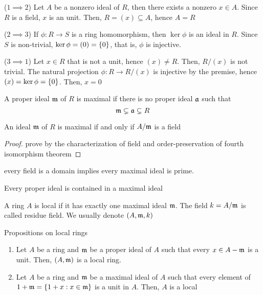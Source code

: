 \begin{longproof}
	($1 \implies 2$) Let $A$ be a nonzero ideal of $R$, then there exists a nonzero $x \in A$. Since $R$ is a field, $x$ is an unit. Then, $R = (x) \subseteq A$, hence $A = R$
	
	($2 \implies 3$) If $\phi: R \to S$ is a ring homomorphism, then $\ker \phi$ is an ideal in $R$. Since $S$ is non-trivial, $\ker \phi = (0) = \{0\}$, that is, $\phi$ is injective.
	
	($3 \implies 1$) Let $x \in R$ that is not a unit, hence $(x) \neq R$. Then, $R / (x)$ is not trivial. The natural projection $\phi: R \to R / (x)$ is injective by the premise, hence $(x) = \ker \phi = \{0\}$. Then, $x = 0$
\end{longproof}

\begin{definition}
	A proper ideal $\mathfrak{m}$ of $R$ is maximal if there is no proper ideal $\mathfrak{a}$ such that
	$$
		\mathfrak{m} \subsetneq \mathfrak{a} \subsetneq R
	$$
\end{definition}

\begin{proposition}
	An ideal $\mathfrak{m}$ of $R$ is maximal if and only if $A / \mathfrak{m}$ is a field
\end{proposition}

\begin{proof}
	prove by the characterization of field and order-preservation of fourth isomorphism theorem
\end{proof}

\begin{remark}
	every field is a domain implies every maximal ideal is prime.
\end{remark}

\begin{proposition}
	Every proper ideal is contained in a maximal ideal 
\end{proposition}

\begin{definition}
	A ring $A$ is local if it has exactly one maximal ideal $\mathfrak{m}$. The field $k = A / \mathfrak{m}$ is called residue field. We usually denote $(A, \mathfrak{m}, k)$
\end{definition}

\begin{proposition}
	Propositions on local rings
	\begin{enumerate}
		\item Let $A$ be a ring and $\mathfrak{m}$ be a proper ideal  of $A$ such that every $x \in A - \mathfrak{m}$ is a unit. Then, $(A, \mathfrak{m})$ is a local ring.
		
		\item Let $A$ be a ring and $\mathfrak{m}$ be a maximal ideal of $A$ such that every element of $1 + \mathfrak{m} = \{1 + x: x \in \mathfrak{m}\}$ is a unit in $A$. Then, $A$ is a local
	\end{enumerate}
\end{proposition}


